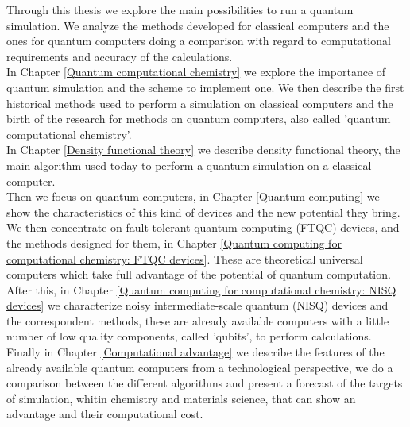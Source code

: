 Through this thesis we explore the main possibilities to run a quantum simulation. We analyze the methods developed for classical computers and the ones for quantum computers doing a comparison with regard to computational requirements and accuracy of the calculations. \\
In Chapter \ref{Quantum computational chemistry} we explore the importance of quantum simulation and the scheme to implement one. We then describe the first historical methods used to perform a simulation on classical computers and the birth of the research for methods on quantum computers, also called 'quantum computational chemistry'. \\
In Chapter \ref{Density functional theory} we describe density functional theory, the main algorithm used today to perform a quantum simulation on a classical computer. \\
Then we focus on quantum computers, in Chapter \ref{Quantum computing} we show the characteristics of this kind of devices and the new potential they bring. We then concentrate on fault-tolerant quantum computing (FTQC) devices, and the methods designed for them, in Chapter \ref{Quantum computing for computational chemistry: FTQC devices}. These are theoretical universal computers which take full advantage of the potential of quantum computation. After this, in Chapter \ref{Quantum computing for computational chemistry: NISQ devices} we characterize noisy intermediate-scale quantum (NISQ) devices and the correspondent methods, these are already available computers with a little number of low quality components, called 'qubits', to perform calculations. \\
Finally in Chapter \ref{Computational advantage} we describe the features of the already available quantum computers from a technological perspective, we do a comparison between the different algorithms and present a forecast of the targets of simulation, whitin chemistry and materials science, that can show an advantage and their computational cost.